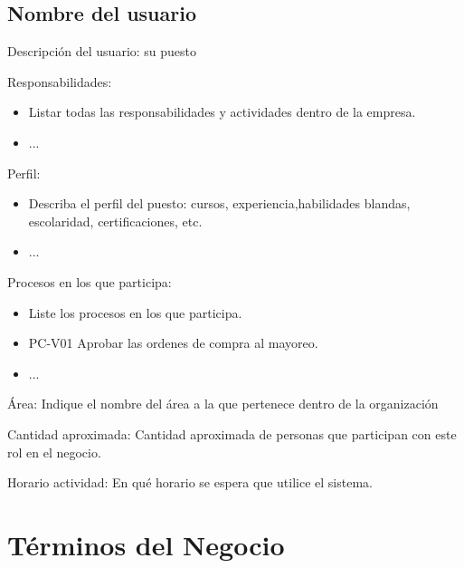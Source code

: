  \begin{Usuario}{\hypertarget{A.NombreDelUsuario}{\subsection{Nombre del usuario}}}{
			Descripción del usuario: su puesto
		}
		\item[Responsabilidades:] \cdtEmpty
		\begin{itemize}
			\item Listar todas las responsabilidades y actividades dentro de la empresa.
			\item ...
		\end{itemize}
		
		\item[Perfil:] \cdtEmpty
		\begin{itemize}
			\item Describa el perfil del puesto: cursos, experiencia,habilidades blandas, escolaridad, certificaciones, etc.
			\item ...
		\end{itemize}
		\item[Procesos en los que participa:] \cdtEmpty
		\begin{itemize}
			\item Liste los procesos en los que participa.
			\item PC-V01 Aprobar las ordenes de compra al mayoreo.
			\item ...
		\end{itemize}
		\item[Área:] Indique el nombre del área a la que pertenece dentro de la organización
		\item[Cantidad aproximada:] Cantidad aproximada de personas que participan con este rol en el negocio.
		\item[Horario actividad:] En qué horario se espera que utilice el sistema. 
	\end{Usuario}
	
\section{Términos del Negocio}
\label{sec:terminosDeNegocio}

	
